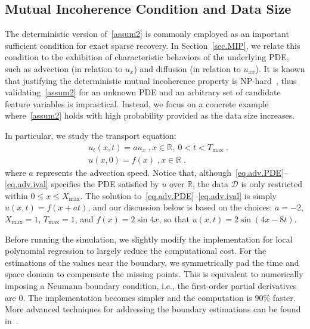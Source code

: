 \documentclass[a4paper,11pt]{article}
\begin{document}
\subsection{Mutual Incoherence Condition and Data Size}
The deterministic version of~\eqref{assum2} is commonly employed as an important sufficient condition for exact sparse recovery. In Section~\ref{sec.MIP}, we relate this condition to the exhibition of characteristic behaviors of the underlying PDE, such as advection (in relation to $u_x$) and diffusion (in relation to $u_{xx}$). It is known that justifying the deterministic mutual incoherence property is NP-hard~\cite{tillmann2013computational}, thus validating~\eqref{assum2} for an unknown PDE and an arbitrary set of candidate feature variables is  impractical. Instead, we focus on a  concrete example where~\eqref{assum2} holds with high probability provided as the data size increases.

In particular, we study the transport equation:
\begin{align}
&u_t(x,t) = au_x\;,x\in\mathbb{R},~0<t<T_{\max}\;.\label{eq.adv.PDE}\\
&u(x,0)=f(x)\;, x\in\mathbb{R}\;.\label{eq.adv.ival}
\end{align}
where $a$ represents the advection speed. Notice that, although~\eqref{eq.adv.PDE}--\eqref{eq.adv.ival} specifies the PDE satisfied by $u$ over $\mathbb{R}$, the data $\mathcal{D}$ is only restricted within $0\leq x\leq X_{\max}$.  The solution to~\eqref{eq.adv.PDE}--\eqref{eq.adv.ival} is simply $u(x,t)=f(x+at)$, and our discussion below is based on the choices: $a=-2$, $X_{\max}=1$, $T_{\max}=1$, and $f(x)=2\sin 4x$, so that $u(x,t)=2\sin(4x-8t)$.

Before running the simulation, we slightly modify the implementation for local polynomial regression to largely reduce the computational cost. For the estimations of the values near the boundary, we symmetrically pad the time and space domain to compensate the missing points. This is equivalent to numerically imposing a Neumann boundary condition, i.e., the first-order partial derivatives are $0$. The implementation becomes simpler and the computation is $90\%$ faster.  More advanced techniques for addressing the boundary estimations can be found in~\cite{cheng1997automatic,hastie1993local}.
\end{document}
